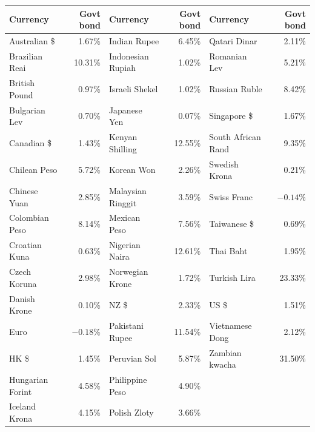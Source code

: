 \begin{center}
\scriptsize
\begin{tabular}{@{}lr@{\hspace{6pt}}lr@{\hspace{6pt}}lr@{}}
\toprule
\textbf{Currency} & \textbf{Govt bond} & \textbf{Currency} & \textbf{Govt bond} & \textbf{Currency} & \textbf{Govt bond}\\
\midrule
Australian \$ & 1.67\% & Indian Rupee & 6.45\% & Qatari Dinar & 2.11\%\\
\textcolor{keyred}{Brazilian Reai} & \textcolor{keyred}{10.31\%} & Indonesian Rupiah & 1.02\% & Romanian Lev & 5.21\%\\
British Pound & 0.97\% & Israeli Shekel & 1.02\% & Russian Ruble & 8.42\%\\
Bulgarian Lev & 0.70\% & Japanese Yen & 0.07\% & Singapore \$ & 1.67\%\\
Canadian \$ & 1.43\% & Kenyan Shilling & 12.55\% & South African Rand & 9.35\%\\
Chilean Peso & 5.72\% & Korean Won & 2.26\% & Swedish Krona & 0.21\%\\
Chinese Yuan & 2.85\% & Malaysian Ringgit & 3.59\% & Swiss Franc & $-0.14\%$\\
Colombian Peso & 8.14\% & Mexican Peso & 7.56\% & Taiwanese \$ & 0.69\%\\
Croatian Kuna & 0.63\% & Nigerian Naira & 12.61\% & Thai Baht & 1.95\%\\
Czech Koruna & 2.98\% & Norwegian Krone & 1.72\% & Turkish Lira & 23.33\%\\
Danish Krone & 0.10\% & NZ \$ & 2.33\% & US \$ & 1.51\%\\
Euro & $-0.18\%$ & Pakistani Rupee & 11.54\% & Vietnamese Dong & 2.12\%\\
HK \$ & 1.45\% & Peruvian Sol & 5.87\% & Zambian kwacha & 31.50\%\\
Hungarian Forint & 4.58\% & Philippine Peso & 4.90\% & & \\
Iceland Krona & 4.15\% & Polish Zloty & 3.66\% & & \\
\bottomrule
\end{tabular}
\end{center}


